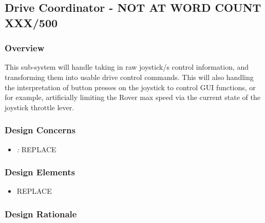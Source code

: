 \subsection{Drive Coordinator - NOT AT WORD COUNT XXX/500}
\subsubsection{Overview}
This sub-system will handle taking in raw joystick/s control information, and transforming them into usable drive control commands.
This will also handling the interpretation of button presses on the joystick to control GUI functions, or for example, artificially limiting the Rover max speed via the current state of the joystick throttle lever.

\subsubsection{Design Concerns}
\begin{itemize}
\item \textit{:} REPLACE

\end{itemize}

\subsubsection{Design Elements}
\begin{itemize}
\item REPLACE
\end{itemize}

\subsubsection{Design Rationale}
